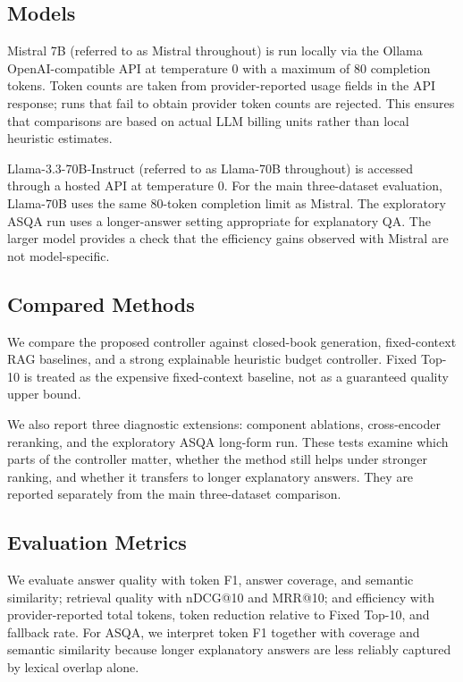 \documentclass[11pt]{article}
\begin{document}
\subsection{Models}

Mistral 7B (referred to as Mistral throughout) is run locally via the Ollama OpenAI-compatible API at temperature 0 with a maximum of 80 completion tokens. Token counts are taken from provider-reported usage fields in the API response; runs that fail to obtain provider token counts are rejected. This ensures that comparisons are based on actual LLM billing units rather than local heuristic estimates.


Llama-3.3-70B-Instruct (referred to as Llama-70B throughout) is accessed through a hosted API at temperature 0. For the main three-dataset evaluation, Llama-70B uses the same 80-token completion limit as Mistral. The exploratory ASQA run uses a longer-answer setting appropriate for explanatory QA. The larger model provides a check that the efficiency gains observed with Mistral are not model-specific.


\subsection{Compared Methods}

We compare the proposed controller against closed-book generation, fixed-context RAG baselines, and a strong explainable heuristic budget controller. Fixed Top-10 is treated as the expensive fixed-context baseline, not as a guaranteed quality upper bound.


We also report three diagnostic extensions: component ablations, cross-encoder reranking, and the exploratory ASQA long-form run. These tests examine which parts of the controller matter, whether the method still helps under stronger ranking, and whether it transfers to longer explanatory answers. They are reported separately from the main three-dataset comparison.


\subsection{Evaluation Metrics}

We evaluate answer quality with token F1, answer coverage, and semantic similarity; retrieval quality with nDCG@10 and MRR@10; and efficiency with provider-reported total tokens, token reduction relative to Fixed Top-10, and fallback rate. For ASQA, we interpret token F1 together with coverage and semantic similarity because longer explanatory answers are less reliably captured by lexical overlap alone.
\end{document}
